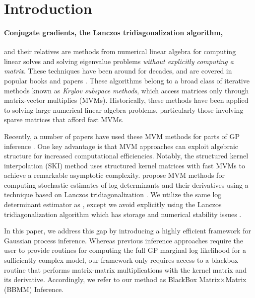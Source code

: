 \section{Introduction}

\paragraph{Conjugate gradients, the Lanczos tridiagonalization algorithm,}
and their relatives are methods from numerical linear algebra for computing linear solves and solving eigenvalue problems \emph{without explicitly computing a matrix}.
These techniques have been around for decades, and are covered in popular books and papers \cite{saad2003iterative,golub2012matrix,demmel1997applied,parlett1980new,lanczos1950iteration,datta2010numerical,paige1970practical}.
These algorithms belong to a broad class of iterative methods known as \emph{Krylov subspace methods}, which access matrices only through matrix-vector multiplies (MVMs).
Historically, these methods have been applied to solving large numerical linear algebra problems, particularly those involving sparse matrices that afford fast MVMs.

Recently, a number of papers have used these MVM methods for parts of GP inference \cite{cunningham2008fast,murray2009gaussian,saatcci2012scalable,wilson2014thesis,wilson2015kernel,dong2017scalable,gardner2018product}.
One key advantage is that MVM approaches can exploit algebraic structure for increased computational efficiencies.
Notably, the structured kernel interpolation (SKI) method \cite{wilson2015kernel} uses structured kernel matrices with fast MVMs to achieve a remarkable asymptotic complexity.
\citet{dong2017scalable} propose MVM methods for computing stochastic estimates of log determinants and their derivatives using a technique based on Lanczos tridiagonalization \cite{golub2009matrices,ubaru2017fast}.
We utilize the same log determinant estimator as \citet{dong2017scalable}, except we avoid explicitly using the Lanczos tridiagonalization algorithm which has storage and numerical stability issues \cite{golub2012matrix}.

In this paper, we address this gap by introducing a highly efficient framework for Gaussian process inference.
Whereas previous inference approaches require the user to provide routines for computing the full GP marginal log likelihood for a sufficiently complex model,
our framework only requires access to a blackbox routine that performs matrix-matrix multiplications with the kernel matrix and its derivative.
Accordingly, we refer to our method as BlackBox Matrix$\times$Matrix (BBMM) Inference.

